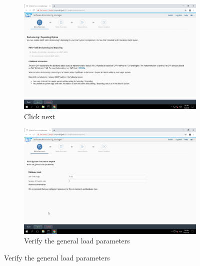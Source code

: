 \begin{figure}[!htb]\ContinuedFloat
    \begin{subfigure}{0.5\textwidth}
        \captionsetup{width=0.8\linewidth}
        \includegraphics[width=0.9\linewidth]{img/Methodologie/SAP16.png}
        \centering
        \caption{Click next}
    \end{subfigure}
    \begin{subfigure}{0.5\textwidth}
        \captionsetup{width=0.8\linewidth}
        \includegraphics[width=0.9\linewidth]{img/Methodologie/SAP15.png} 
        \centering
        \caption{Verify the general load parameters}
    \end{subfigure}
\end{figure}
